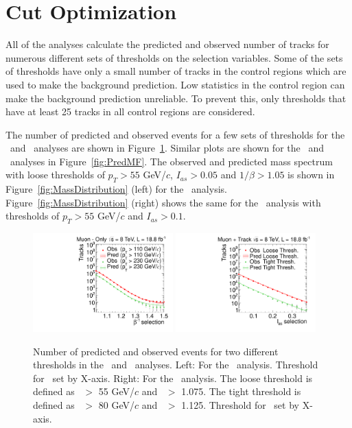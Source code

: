 \section{Cut Optimization \label{sec:Optim}}
All of the analyses calculate the predicted and observed number of tracks for numerous different sets of thresholds on the selection variables.
Some of the sets of thresholds have only a small number of tracks in the control regions which are used to make the background prediction.
Low statistics in the control region can make the background prediction unreliable.
To prevent this, only thresholds that have at least 25 tracks in all control regions are considered. 

The number of predicted and observed events for a few sets of thresholds for the \muononly\ and \tktof\ analyses are shown in Figure~\ref{fig:PredPt230}. 
Similar plots are shown for the \tkonly\ and \multi\ analyses in Figure~\ref{fig:PredMF}.
The observed and predicted mass spectrum with loose thresholds of $p_T > 55$ GeV/$c$, $I_{as}>0.05$ and $1/\beta>1.05$ is shown in Figure~\ref{fig:MassDistribution} (left)
for the \tktof\ analysis. Figure~\ref{fig:MassDistribution} (right) shows the same for the \tkonly\ analysis with thresholds of $p_T > 55$ GeV/$c$ and $I_{as}>0.1$.

\begin{figure}
\centering
  \includegraphics[clip=false, trim=0.0cm 0cm 0.0cm 0cm, width=0.48\textwidth]{figures/muonly/Prediction_Data8TeV_NPredVsNObs}
  \includegraphics[clip=false, trim=0.0cm 0cm 0.0cm 0cm, width=0.48\textwidth]{figures/tkmu/Prediction_Data8TeV_NPredVsNObs}
  \caption[Number of predicted and observed events for two different thresholds in the \muononly\ and \tktof\ analyses.]
{Number of predicted and observed events for two different thresholds in the \muononly\ and \tktof\ analyses. 
Left: For the \muononly\ analysis. Threshold for \invbeta\ set by X-axis.
Right: For the \tktof\ analysis. The loose threshold is defined as \pt\ $>$ 55 GeV/$c$ and \invbeta\ $>$ 1.075.
The tight threshold is defined as \pt\ $>$ 80 GeV/$c$ and \invbeta\ $>$ 1.125.  Threshold for \ias\ set by X-axis.}
    \label{fig:PredPt230}
\end{figure}

